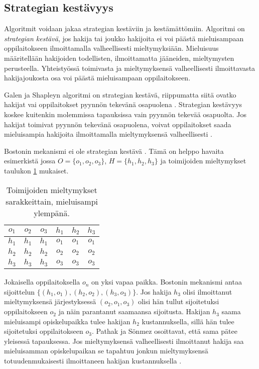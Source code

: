 \documentclass[gradu, twoside]{tktltiki}
\begin{document}
\subsection{Strategian kestävyys}

Algoritmit voidaan jakaa strategian kestäviin ja kestämättömiin.
Algoritmi on \emph{strategian kestävä}, jos hakija tai joukko
hakijoita ei voi päästä mieluisampaan oppilaitokseen ilmoittamalla
valheellisesti mieltymyksiään. Mieluisuus määritellään hakijoiden
todellisten, ilmoittamatta jääneiden, mieltymysten perusteella.
Yhteistyössä toimivasta ja mieltymyksensä valheellisesti ilmoittavasta
hakijajoukosta osa voi päästä mieluisampaan oppilaitokseen.

Galen ja Shapleyn algoritmi on strategian kestävä, riippumatta siitä
ovatko hakijat vai oppilaitokset pyynnön tekevänä osapuolena
\cite{dubins81}. Strategian kestävyys koskee kuitenkin molemmissa
tapauksissa vain pyynnön tekevää osapuolta. Jos hakijat toimivat
pyynnön tekevänä osapuolena, voivat oppilaitokset saada mieluisampia
hakijoita ilmoittamalla mieltymyksensä valheellisesti \cite{dubins81}.

Bostonin mekanismi ei ole strategian kestävä \cite{abdusön03}. Tämä on
helppo havaita esimerkistä jossa $O = \{o_1, o_2, o_3\}$, $H = \{h_1,
h_2, h_3\}$ ja toimijoiden mieltymykset taulukon
\ref{boston_strategia} mukaiset.

\begin{table}[h]
  \begin{center}
    \begin{tabular}{ c c c | c c c }
      $o_1$ & $o_2$ & $o_3$ & $h_1$ & $h_2$ & $h_3$ \\
      \hline
      $h_1$ & $h_1$ & $h_1$ & $o_1$ & $o_1$ & $o_1$ \\
      $h_2$ & $h_2$ & $h_2$ & $o_2$ & $o_2$ & $o_2$ \\
      $h_3$ & $h_3$ & $h_3$ & $o_3$ & $o_3$ & $o_3$
    \end{tabular}
    \caption{Toimijoiden mieltymykset sarakkeittain, mieluisampi ylempänä.}
    \label{boston_strategia}
  \end{center}
\end{table}

Jokaisella oppilaitoksella $o_n$ on yksi vapaa paikka. Bostonin
mekanismi antaa sijoittelun $\{(h_1, o_1), (h_2, o_2), (h_3, o_3)\}$.
Jos hakija $h_3$ olisi ilmoittanut mieltymyksensä järjestyksessä
$(o_2, o_1, o_3)$ olisi hän tullut sijoitetuksi oppilaitokseen $o_2$
ja näin parantanut saamaansa sijoitusta. Hakijan $h_3$ saama
mieluisampi opiskelupaikka tulee hakijan $h_2$ kustannuksella, sillä
hän tulee sijoitetuksi oppilaitokseen $o_3$. Pathak ja Sönmez
osoittavat, että sama pätee yleisessä tapauksessa. Jos mieltymyksensä
valheellisesti ilmoittanut hakija saa mieluisamman opiskelupaikan se
tapahtuu jonkun mieltymyksensä totuudenmukaisesti ilmoittaneen hakijan
kustannuksella \cite{pathak08}.
\end{document}
